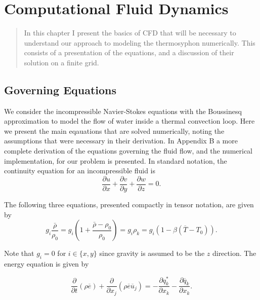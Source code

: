 \chapter{Computational Fluid Dynamics}

\begin{quote}
In this chapter I present the basics of CFD that will be necessary to understand our approach to modeling the thermosyphon numerically.
This consists of a presentation of the equations, and a discussion of their solution on a finite grid.
\end{quote}

\section{Governing Equations}

We consider the incompressible Navier-Stokes equations with the Boussinesq approximation to model the flow of water inside a thermal convection loop.
Here we present the main eqauations that are solved numerically, noting the assumptions that were necessary in their derivation.
In Appendix B a more complete derivation of the equations governing the fluid flow, and the numerical implementation, for our problem is presented.
In standard notation, the continuity equation for an incompressible fluid is
\begin{equation} \frac{\partial u}{\partial x} + \frac{\partial v}{\partial y} + \frac{\partial w}{\partial z} = 0. \label{eq:NScontIco} \end{equation}

The following three equations, presented compactly in tensor notation, are given by
\begin{equation*} g_i\frac{\bar{\rho}}{\rho _0} = g_i \left ( 1 + \frac{\bar{\rho} - \rho _0}{\rho _0} \right ) = g_i \rho _k  = g_i \left (1 - \beta \left (\overline{T} - T _0\right ) \right ) .\end{equation*}

Note that $g_i = 0$ for $i \in \{ x,y\}$ since gravity is assumed to be the $z$ direction.
The energy equation is given by

\begin{equation} \frac{\partial }{\partial t} \left ( \rho \overline{e}\right ) + \frac{\partial}{\partial x_j} \left ( \rho \overline{e} \overline{u}_j \right ) 
= 
- \frac{\partial q_k^*}{\partial x_k}
- \frac{\partial \overline{q}_k}{\partial x_k}.
\end{equation}


